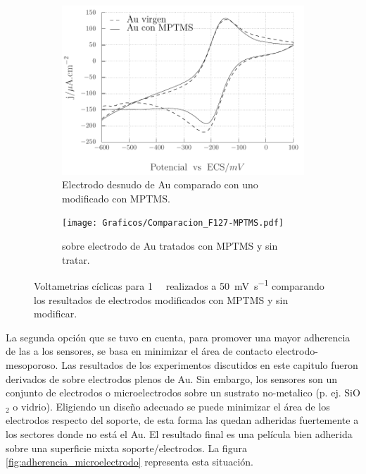 	 			\begin{figure}[th]
		 	   	    \begin{subfigure}[t]{0.49\textwidth}
			        	\includegraphics[width=\textwidth]{Graficos/Comparacion_Au-MPTMS.pdf}
			       		\caption{Electrodo desnudo de Au comparado con uno modificado con MPTMS.}		 
			       		\end{subfigure}
					\begin{subfigure}[t]{0.49\textwidth}
			 	   	    \texttt{[image: Graficos/Comparacion\_F127-MPTMS.pdf]}
			       		\caption{\pdmF\space sobre electrodo de Au tratados con MPTMS y sin tratar.}
			       		\end{subfigure}
					 	\caption[Comparacion de superficies con y sin MPTMS.]{Voltametrias cíclicas para \aminorutenio\space \SI{1}{\milli\Molar} realizados a \SI{50}{\milli\volt.\second^{-1}} comparando los resultados de electrodos modificados con MPTMS y sin modificar.}
					 \label{fig:comparaciones_MPTMS}	
				     \end{figure}
			La segunda opción que se tuvo en cuenta, para promover una mayor adherencia de las \pdm\space a los sensores, se basa en minimizar el área de contacto electrodo-mesoporoso. Las resultados de los experimentos discutidos en este capitulo fueron derivados de \pdm\space sobre electrodos plenos de Au. Sin embargo, los sensores son un conjunto de electrodos o microelectrodos sobre un sustrato no-metalico (p. ej. SiO$_2$ o vidrio). Eligiendo un diseño adecuado se puede minimizar el área de los electrodos respecto del soporte, de esta forma las \pdm\space quedan adheridas fuertemente a los sectores donde no está el Au. El resultado final es una película bien adherida sobre una superficie mixta soporte/electrodos.  La figura \ref{fig:adherencia_microelectrodo} representa esta situación.
